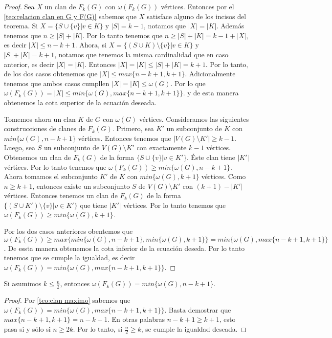     \begin{proof}
        Sea $X$ un clan de $F_k(G)$ con $\omega(F_k(G))$ v\'ertices. Entonces
        por el \cref{teo:relacion clan en G y F(G)} sabemos que $X$ satisface alguno de los incisos
        del teorema. Si $X = \{S \cup \{v\}| v \in K\}$ y $|S| = k-1$, notamos
        que $|X| = |K|$. Adem\'as tenemos que $n \geq |S| + |K|$. Por lo tanto
        tenemos que $n \geq |S| + |K| = k-1 + |X|$, es decir $|X| \leq n-k+1$.
        Ahora, si $X = \{(S\cup K) \setminus \{v\}| v \in K \}$ y $|S| + |K| =
        k+1$, notamos que tenemos la misma cardinalidad que en caso anterior, es
        decir $|X| =|K|$. Entonces $|X| = |K| \leq |S| + |K| = k+1$. Por lo
        tanto, de los dos casos obtenemos que $|X| \leq max\{n-k+1, k+1\}$.
        Adicionalmente tenemos que ambos casos cumpllen $|X| = |K| \leq
        \omega(G)$. Por lo que $\omega(F_k(G)) = |X| \leq min \{\omega(G), max
        \{n-k+1, k+1\}\}$. y de esta manera obtenemos la cota superior de la
        ecuaci\'on deseada.

        Tomemos ahora un clan $K$ de $G$ con $\omega(G)$ v\'ertices.
        Consideramos las siguientes construcciones de clanes de $F_k(G)$.
        Primero, sea $K'$ un subconjunto de $K$ con $min\{\omega(G),n-k+1\}$
        v\'ertices. Entonces tenemos que $|V(G) \setminus K'| \geq k-1$. Luego,
        sea $S$ un subconjunto de $V(G) \setminus K'$ con exactamente $k-1$
        v\'ertices. Obtenemos un clan de $F_k(G)$ de la forma $\{ S \cup \{v\}|v
        \in K'\}$. \'Este clan tiene $|K'|$ v\'ertices. Por lo tanto tenemos que
        $\omega(F_k(G)) \geq min \{\omega(G), n-k+1\}$. Ahora tomamos el
        subconjunto $K'$ de $K$ con $min \{ \omega(G), k+1\}$ v\'ertices. Como
        $n \geq k+1$, entonces existe un subconjunto $S$ de $V(G) \setminus K'$
        con $(k+1)-|K'|$ v\'ertices. Entonces tenemos un clan de $F_k(G)$ de la
        forma $\{ (S \cup K') \setminus \{v\}|v \in K'\}$ que tiene $|K'|$
        v\'ertices. Por lo tanto tenemos que $\omega(F_k(G)) \geq min
        \{\omega(G), k+1\}$.

        Por los dos casos anteriores obentemos que $\omega(F_k(G)) \geq max
        \{min \{\omega(G), n-k+1\}, min \{\omega(G), k+1 \}\} = min \{\omega(G),
        max \{n-k+1,k+1\}\}$. De essta manera obtenemos la cota inferior de la
        ecuaci\'on deseda. Por lo tanto tenemos que se cumple la igualdad, es
        decir  $\omega(F_k(G))= min \{\omega(G), max \{n-k+1,k+1\}\}$.
    \end{proof}

    \begin{corolario}
        Si asumimos $k \leq \frac{n}{2}$, entonces $\omega(F_k(G))= min
        \{\omega(G), n-k+1\}$.
    \end{corolario}

    \begin{proof}
        Por \cref{teo:clan maximo} sabemos que $\omega(F_k(G))= min \{\omega(G), max
        \{n-k+1,k+1\}\}$. Basta demostrar que $max \{n-k+1, k+1\} = n-k+1$. En
        otras palabras $n-k+1 \geq k+1$, esto pasa si y s\'olo si $n \geq 2k$.
        Por lo tanto, si $\frac{n}{2} \geq k$, se cumple la igualdad deseada.
    \end{proof}